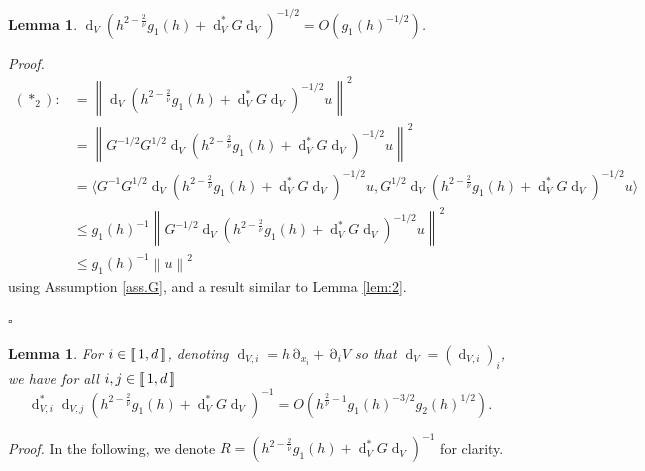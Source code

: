 \documentclass[12pt]{amsart}
\def\<{\langle}
\def\>{\rangle}
\newcommand{\bp}{{\it Proof. }}
\newcommand{\ep}{\hfill $\square$}
\renewcommand{\d}{\operatorname{d}}
\numberwithin{equation}{section}
\numberwithin{figure}{section}
\DeclareMathOperator{\p}{\partial}
\newcommand{\vvert}[1]{\left\lVert#1\right\rVert}
\newcommand{\lb}{\operatorname{[\negthinspace [}}
\newcommand{\rb}{\operatorname{]\negthinspace ]}}
\newtheorem{lemma}[defin]{Lemma}
\begin{document}
\begin{lemma}\label{lem:3}
    $\d_V(h^{2-\frac2{\overline{\nu}}}g_1(h) + \d_V^*G\d_V)^{-1/2} = O(g_1(h)^{-1/2})$.
\end{lemma}
\bp
\begin{equation*}
\begin{split}
    (\ast_2) :&= \vvert{\d_V(h^{2-\frac2{\overline{\nu}}}g_1(h) + \d_V^*G\d_V)^{-1/2}u}^2\\
    &= \vvert{G^{-1/2}G^{1/2}\d_V(h^{2-\frac2{\overline{\nu}}}g_1(h) + \d_V^*G\d_V)^{-1/2}u}^2\\
    &= \<G^{-1}G^{1/2}\d_V(h^{2-\frac2{\overline{\nu}}}g_1(h) + \d_V^*G\d_V)^{-1/2}u,G^{1/2}\d_V(h^{2-\frac2{\overline{\nu}}}g_1(h) + \d_V^*G\d_V)^{-1/2}u\>\\
    &\leq g_1(h)^{-1}\vvert{G^{-1/2}\d_V(h^{2-\frac2{\overline{\nu}}}g_1(h) + \d_V^*G\d_V)^{-1/2}u}^2\\
    &\leq g_1(h)^{-1}\vvert{u}^2
\end{split}
\end{equation*}
using Assumption \ref{ass.G}, and a result similar to Lemma \ref{lem:2}.

\ep

\begin{lemma}\label{lem:4}
    For $i\in\lb1,d\rb$, denoting $\d_{V,i} = h\p_{x_i} + \p_iV$ so that $\d_V = (\d_{V,i})_i$, we have for all $i,j\in\lb1,d\rb$
    \begin{equation*}
    \d_{V,i}^*\d_{V,j}(h^{2-\frac2{\overline{\nu}}}g_1(h) + \d_V^*G\d_V)^{-1} = O(h^{\frac{2}{\overline{\nu}} - 1}g_1(h)^{-3/2}g_2(h)^{1/2}).
    \end{equation*}
\end{lemma}
\bp
In the following, we denote $R = (h^{2-\frac2{\overline{\nu}}}g_1(h) + \d_V^*G\d_V)^{-1}$ for clarity.
\end{document}
